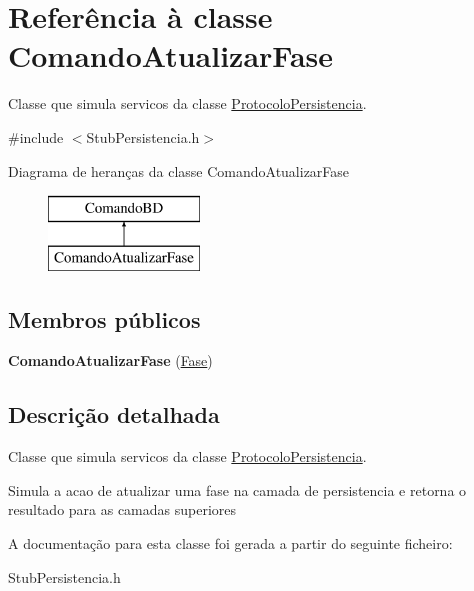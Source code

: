\hypertarget{class_comando_atualizar_fase}{
\section{\-Referência à classe \-Comando\-Atualizar\-Fase}
\label{class_comando_atualizar_fase}
}


\-Classe que simula servicos da classe \hyperlink{class_protocolo_persistencia}{\-Protocolo\-Persistencia}.  




{\ttfamily \#include $<$\-Stub\-Persistencia.\-h$>$}

\-Diagrama de heranças da classe \-Comando\-Atualizar\-Fase\begin{figure}[H]
\begin{center}
\leavevmode
\includegraphics[height=2.000000cm]{class_comando_atualizar_fase}
\end{center}
\end{figure}
\subsection*{\-Membros públicos}
\begin{DoxyCompactItemize}
\item 
\hypertarget{class_comando_atualizar_fase_a5db04acdba2e5e597014ef2369cbb55c}{
{\bfseries \-Comando\-Atualizar\-Fase} (\hyperlink{class_fase}{\-Fase})}
\label{class_comando_atualizar_fase_a5db04acdba2e5e597014ef2369cbb55c}

\end{DoxyCompactItemize}


\subsection{\-Descrição detalhada}
\-Classe que simula servicos da classe \hyperlink{class_protocolo_persistencia}{\-Protocolo\-Persistencia}. 

\-Simula a acao de atualizar uma fase na camada de persistencia e retorna o resultado para as camadas superiores 

\-A documentação para esta classe foi gerada a partir do seguinte ficheiro\-:\begin{DoxyCompactItemize}
\item 
\-Stub\-Persistencia.\-h\end{DoxyCompactItemize}
